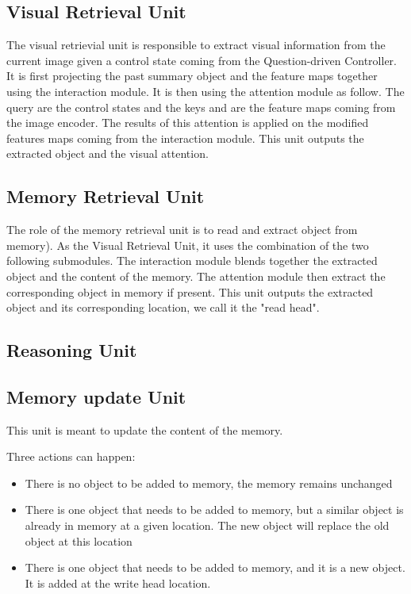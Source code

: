 \subsection{Visual Retrieval Unit}

The visual retrievial unit is responsible to extract visual information from the current image given a control state coming from the Question-driven Controller. It is first projecting the past summary object and the feature maps together using the interaction module.
It is then using the attention module as follow. The query are the control states and the keys and are the feature maps coming from the image encoder. The results of this attention is applied on the modified features maps coming from the interaction module.  
This unit outputs the extracted object and the visual attention.

\subsection{Memory Retrieval Unit}

The role of the memory retrieval unit is to read and extract object from memory).
As the Visual Retrieval Unit, it uses the combination of the two following submodules. The interaction module blends together the extracted object and the content of the memory. The attention module then extract the corresponding object in memory if present. This unit outputs the extracted object and its corresponding location, we call it the "read head".


\subsection{Reasoning Unit}


\subsection{Memory update Unit}

This unit is meant to update the content of the memory. 

Three actions can happen:

\begin{itemize}
	\item There is no object to be added to memory, the memory remains unchanged
	\item There is one object that needs to be added to memory, but a similar object is already in memory at a given location. The new object will replace the old object at this location
	
	\item There is one object that needs to be added to memory, and  it is a new object. It is added at the write head location.
\end{itemize}


